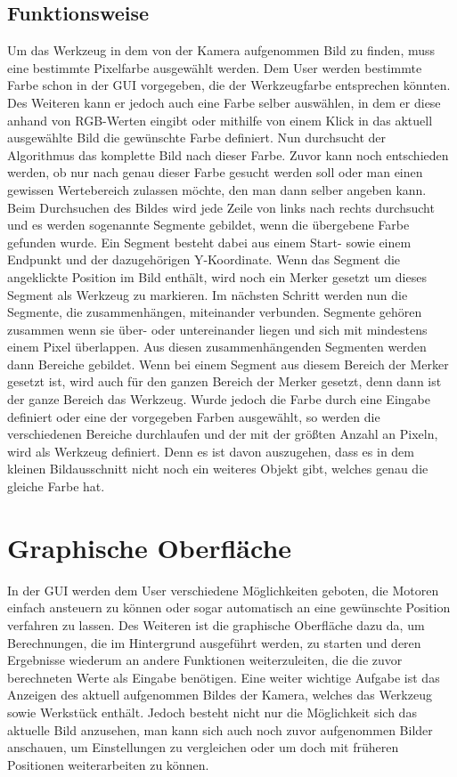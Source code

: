 \documentclass[12pt,a4paper,bibliography=totocnumbered,listof=totocnumbered]{scrartcl}
\begin{document}
\subsection{Funktionsweise}
Um das Werkzeug in dem von der Kamera aufgenommen Bild zu finden, muss eine bestimmte Pixelfarbe ausgewählt werden.  Dem User werden bestimmte Farbe schon in der GUI vorgegeben, die der Werkzeugfarbe entsprechen könnten. Des Weiteren kann er jedoch auch eine Farbe selber auswählen, in dem er diese anhand von RGB-Werten eingibt oder mithilfe von einem Klick in das aktuell ausgewählte Bild die gewünschte Farbe definiert. Nun durchsucht der Algorithmus das komplette Bild nach dieser Farbe. Zuvor kann noch entschieden werden, ob nur nach genau dieser Farbe gesucht werden soll oder man einen gewissen Wertebereich zulassen möchte, den man dann selber angeben kann. Beim Durchsuchen des Bildes wird jede Zeile von links nach rechts durchsucht und es werden sogenannte Segmente gebildet, wenn die übergebene Farbe gefunden wurde. Ein Segment besteht dabei aus einem Start- sowie einem Endpunkt und der dazugehörigen Y-Koordinate. Wenn das Segment die angeklickte Position im Bild enthält, wird noch ein Merker gesetzt um dieses Segment als Werkzeug zu markieren. Im nächsten Schritt werden nun die Segmente, die zusammenhängen, miteinander verbunden. Segmente gehören zusammen wenn sie über- oder untereinander liegen und sich mit mindestens einem Pixel überlappen. Aus diesen zusammenhängenden Segmenten werden dann Bereiche gebildet. Wenn bei einem Segment aus diesem Bereich der Merker gesetzt ist, wird auch für den ganzen Bereich der Merker gesetzt, denn dann ist der ganze Bereich das Werkzeug. Wurde jedoch die Farbe durch eine Eingabe definiert oder eine der vorgegeben Farben ausgewählt, so werden die verschiedenen Bereiche durchlaufen und der mit der größten Anzahl an Pixeln, wird als Werkzeug definiert. Denn es ist davon auszugehen, dass es in dem kleinen Bildausschnitt nicht noch ein weiteres Objekt gibt, welches genau die gleiche Farbe hat.


\section{Graphische Oberfläche}
In der GUI werden dem User verschiedene Möglichkeiten geboten, die Motoren einfach ansteuern zu können oder sogar automatisch an eine gewünschte Position verfahren zu lassen.  Des Weiteren ist die graphische Oberfläche dazu da, um Berechnungen, die im Hintergrund ausgeführt werden, zu starten und deren Ergebnisse wiederum an andere Funktionen weiterzuleiten, die die zuvor berechneten Werte als Eingabe benötigen.
Eine weiter wichtige Aufgabe ist das Anzeigen des aktuell aufgenommen Bildes der Kamera, welches das Werkzeug sowie Werkstück enthält. Jedoch besteht nicht nur die Möglichkeit sich das aktuelle Bild anzusehen, man kann sich auch noch zuvor aufgenommen Bilder anschauen, um Einstellungen zu vergleichen oder um doch mit früheren Positionen weiterarbeiten zu können.
\end{document}
